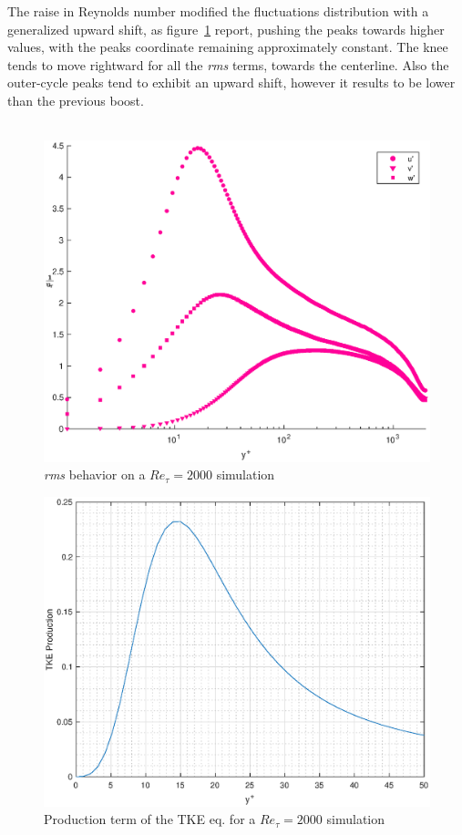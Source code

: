 The raise in Reynolds number modified the fluctuations distribution with a generalized upward shift, as figure~\ref{rms:2000} report, pushing the peaks towards higher values, with the peaks coordinate remaining approximately constant. The knee tends to move rightward for all the \emph{rms} terms, towards the centerline. Also the outer-cycle peaks tend to exhibit an upward shift, however it results to be lower than the previous boost.\\~\par

\begin{figure}
\begin{center}
\includegraphics[scale=0.55]{grafici/rms_2000.eps}
\caption{\emph{rms} behavior on a $Re_{\tau}=2000$ simulation}
\label{rms:2000}
\end{center} 
\end{figure}

\begin{figure}
\begin{center}
\includegraphics[scale=0.55]{grafici/tke_prod_2000.eps}
\caption{Production term of the TKE eq. for a $Re_{\tau}=2000$ simulation}
\label{tke:prod:2000}
\end{center} 
\end{figure}

